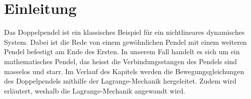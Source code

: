 
\section{Einleitung}
Das Doppelpendel ist ein klassisches Beispiel für ein nichtlineares dynamisches System.
Dabei ist die Rede von einem gewöhnlichen Pendel mit einem weiteren Pendel
befestigt am Ende des Ersten.
In unserem Fall handelt es sich um ein mathematisches Pendel, das heisst
die Verbindungsstangen des Pendels sind masselos und starr.
Im Verlauf des Kapitels werden die Bewegungsgleichungen des Doppelpendels
mithilfe der Lagrange-Mechanik hergeleitet.
Zudem wird erläutert, weshalb die Lagrange-Mechanik angewandt wird.